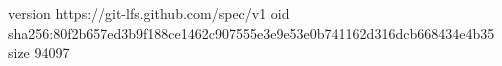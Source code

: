 version https://git-lfs.github.com/spec/v1
oid sha256:80f2b657ed3b9f188ce1462c907555e3e9e53e0b741162d316dcb668434e4b35
size 94097
